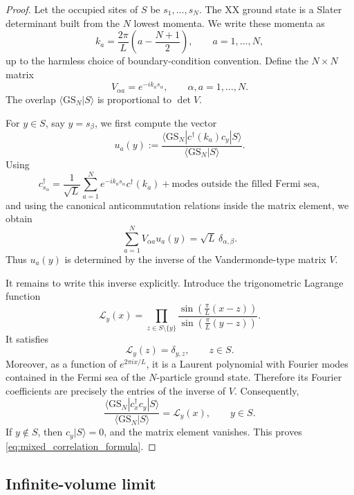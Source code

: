 \documentclass[11pt]{article}
\numberwithin{equation}{section}
\newcommand{\1}{\mathbf 1}
\begin{document}
\begin{proof}
Let the occupied sites of \(S\) be \(s_1,\ldots,s_N\).  The XX ground state is a
Slater determinant built from the \(N\) lowest momenta.  We write these momenta
as
\[
    k_a
    =
    \frac{2\pi}{L}
    \left(
    a-\frac{N+1}{2}
    \right),
    \qquad a=1,\ldots,N,
\]
up to the harmless choice of boundary-condition convention.  Define the
\(N\times N\) matrix
\[
    V_{\alpha a}=e^{-ik_a s_\alpha},
    \qquad
    \alpha,a=1,\ldots,N.
\]
The overlap \(\langle \mathrm{GS}_N|S\rangle\) is proportional to
\(\det V\).

For \(y\in S\), say \(y=s_\beta\), we first compute the vector
\[
    u_a(y)
    :=
    \frac{
    \langle \mathrm{GS}_N|c^\dagger(k_a)c_y|S\rangle
    }{
    \langle \mathrm{GS}_N|S\rangle
    }.
\]
Using
\[
    c_{s_\alpha}^\dagger
    =
    \frac{1}{\sqrt L}\sum_{a=1}^N e^{-ik_a s_\alpha}c^\dagger(k_a)
    +\text{modes outside the filled Fermi sea},
\]
and using the canonical anticommutation relations inside the matrix element, we
obtain
\[
    \sum_{a=1}^N V_{\alpha a}u_a(y)
    =
    \sqrt L\,\delta_{\alpha,\beta}.
\]
Thus \(u_a(y)\) is determined by the inverse of the Vandermonde-type matrix
\(V\).

It remains to write this inverse explicitly.  Introduce the trigonometric
Lagrange function
\[
    \mathcal L_y(x)
    =
    \prod_{z\in S\setminus\{y\}}
    \frac{
    \sin\left(\frac{\pi}{L}(x-z)\right)
    }{
    \sin\left(\frac{\pi}{L}(y-z)\right)
    }.
\]
It satisfies
\[
    \mathcal L_y(z)=\delta_{y,z},
    \qquad z\in S.
\]
Moreover, as a function of \(e^{2\pi i x/L}\), it is a Laurent polynomial with
Fourier modes contained in the Fermi sea of the \(N\)-particle ground state.
Therefore its Fourier coefficients are precisely the entries of the inverse of
\(V\).  Consequently,
\[
    \frac{
    \langle \mathrm{GS}_N|c_x^\dagger c_y|S\rangle
    }{
    \langle \mathrm{GS}_N|S\rangle
    }
    =
    \mathcal L_y(x),
    \qquad y\in S.
\]
If \(y\notin S\), then \(c_y|S\rangle=0\), and the matrix element vanishes.  This
proves \eqref{eq:mixed_correlation_formula}.
\end{proof}

\subsection{Infinite-volume limit}
\end{document}
